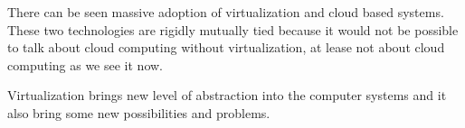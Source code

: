 %
%
%
%

There can be seen massive adoption of virtualization and cloud based systems. These two technologies are rigidly mutually tied because it would not be possible to talk about cloud computing without virtualization, at lease not about cloud computing as we see it now.

Virtualization brings new level of abstraction into the computer systems and it also bring some new possibilities and problems. 

